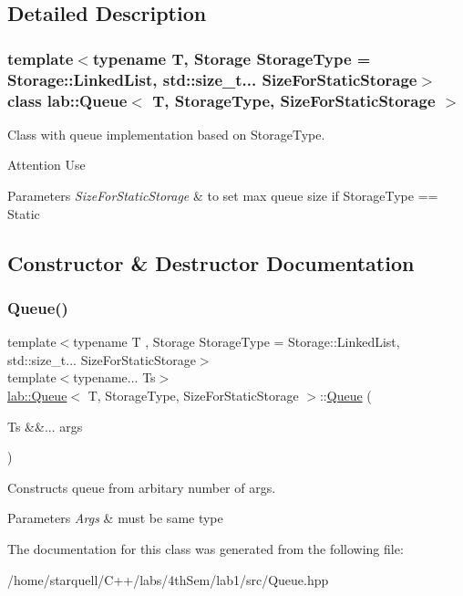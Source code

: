 \subsection{Detailed Description}
\subsubsection*{template$<$typename T, Storage Storage\+Type = Storage\+::\+Linked\+List, std\+::size\+\_\+t... Size\+For\+Static\+Storage$>$\newline
class lab\+::\+Queue$<$ T, Storage\+Type, Size\+For\+Static\+Storage $>$}

Class with queue implementation based on {\ttfamily Storage\+Type}. 

\begin{DoxyAttention}{Attention}
Use 
\end{DoxyAttention}

\begin{DoxyParams}{Parameters}
{\em Size\+For\+Static\+Storage} & to set max queue size if Storage\+Type == Static \\
\hline
\end{DoxyParams}


\subsection{Constructor \& Destructor Documentation}
\mbox{\label{classlab_1_1Queue_ae4b1fd4f3c92ac1ea001777879e87c58}} 
\subsubsection{\texorpdfstring{Queue()}{Queue()}}
{\footnotesize\ttfamily template$<$typename T , Storage Storage\+Type = Storage\+::\+Linked\+List, std\+::size\+\_\+t... Size\+For\+Static\+Storage$>$ \\
template$<$typename... Ts$>$ \\
\hyperlink{classlab_1_1Queue}{lab\+::\+Queue}$<$ T, Storage\+Type, Size\+For\+Static\+Storage $>$\+::\hyperlink{classlab_1_1Queue}{Queue} (\begin{DoxyParamCaption}\item[{Ts \&\&...}]{args }\end{DoxyParamCaption})\hspace{0.3cm}{\ttfamily [inline]}}



Constructs queue from arbitary number of args. 


\begin{DoxyParams}{Parameters}
{\em Args} & must be same type \\
\hline
\end{DoxyParams}


The documentation for this class was generated from the following file\+:\begin{DoxyCompactItemize}
\item 
/home/starquell/\+C++/labs/4th\+Sem/lab1/src/Queue.\+hpp\end{DoxyCompactItemize}
